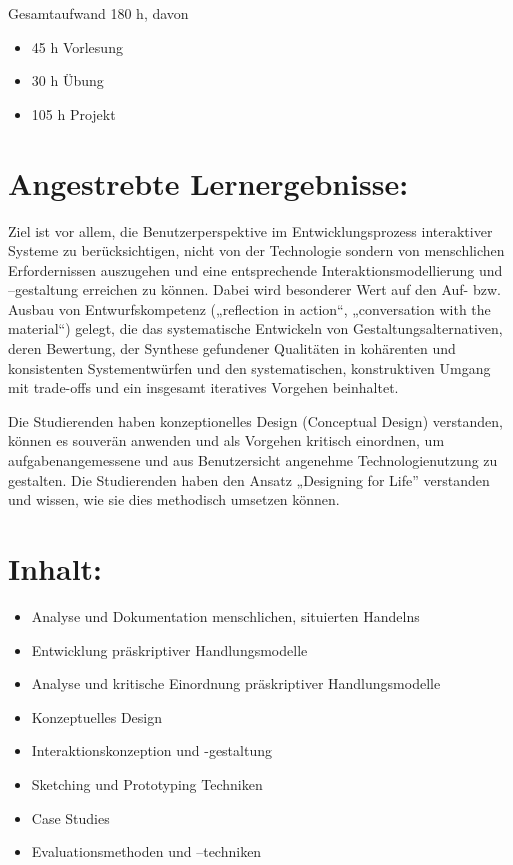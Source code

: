 Gesamtaufwand 180 h, davon

\begin{itemize}
\item
  45 h Vorlesung
\item
  30 h Übung
\item
  105 h Projekt
\end{itemize}

\section*{Angestrebte
Lernergebnisse:}\label{angestrebte-lernergebnisse-5}

Ziel ist vor allem, die Benutzerperspektive im Entwicklungsprozess
interaktiver Systeme zu berücksichtigen, nicht von der Technologie
sondern von menschlichen Erfordernissen auszugehen und eine
entsprechende Interaktionsmodellierung und --gestaltung erreichen zu
können. Dabei wird besonderer Wert auf den Auf- bzw. Ausbau von
Entwurfskompetenz („reflection in action``, „conversation with the
material``) gelegt, die das systematische Entwickeln von
Gestaltungsalternativen, deren Bewertung, der Synthese gefundener
Qualitäten in kohärenten und konsistenten Systementwürfen und den
systematischen, konstruktiven Umgang mit trade-offs und ein insgesamt
iteratives Vorgehen beinhaltet.

Die Studierenden haben konzeptionelles Design (Conceptual Design)
verstanden, können es souverän anwenden und als Vorgehen kritisch
einordnen, um aufgabenangemessene und aus Benutzersicht angenehme
Technologienutzung zu gestalten. Die Studierenden haben den Ansatz
„Designing for Life'' verstanden und wissen, wie sie dies methodisch
umsetzen können.

\section*{Inhalt:}\label{inhalt-5}

\begin{itemize}
\item
  Analyse und Dokumentation menschlichen, situierten Handelns
\item
  Entwicklung präskriptiver Handlungsmodelle
\item
  Analyse und kritische Einordnung präskriptiver Handlungsmodelle
\item
  Konzeptuelles Design
\item
  Interaktionskonzeption und -gestaltung
\item
  Sketching und Prototyping Techniken
\item
  Case Studies
\item
  Evaluationsmethoden und --techniken
\end{itemize}

